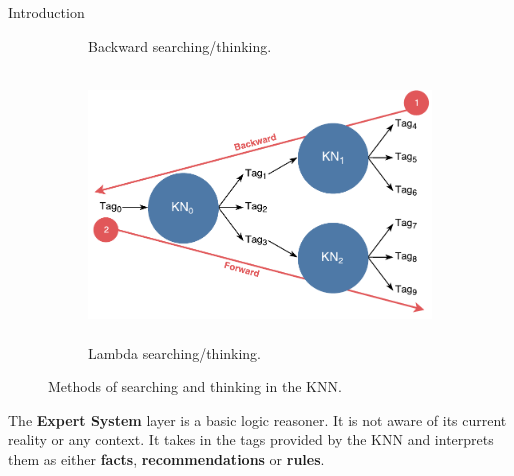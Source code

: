 \documentclass[final]{beamer} %
\begin{document}
\begin{frame}
\begin{columns}
\begin{column}{.33\textwidth}
{\begin{block}{Introduction}
\begin{figure}[!htb]
\begin{subfigure}[!htb]{0.49\columnwidth}
							\caption{Backward searching/thinking.}
							\label{think_backwards}
						\end{subfigure}
						\begin{subfigure}[!htb]{0.49\columnwidth}
							\centering
							\includegraphics[height=2.8in]{figures/lambda_search.pdf}
							\caption{Lambda searching/thinking.}
							\label{think_lambda}
						\end{subfigure}
						\caption{Methods of searching and thinking in the KNN.}
					\end{figure}
					
					\parbox{0.99\textwidth}{The \textbf{Expert System} layer is a basic logic reasoner. It is not aware of its current reality or any context. It takes in the tags provided by the KNN and interprets them as either \textbf{facts}, \textbf{recommendations} or \textbf{rules}.
						
}
\end{block}}
\end{column}
\end{columns}
\end{frame}
\end{document}
